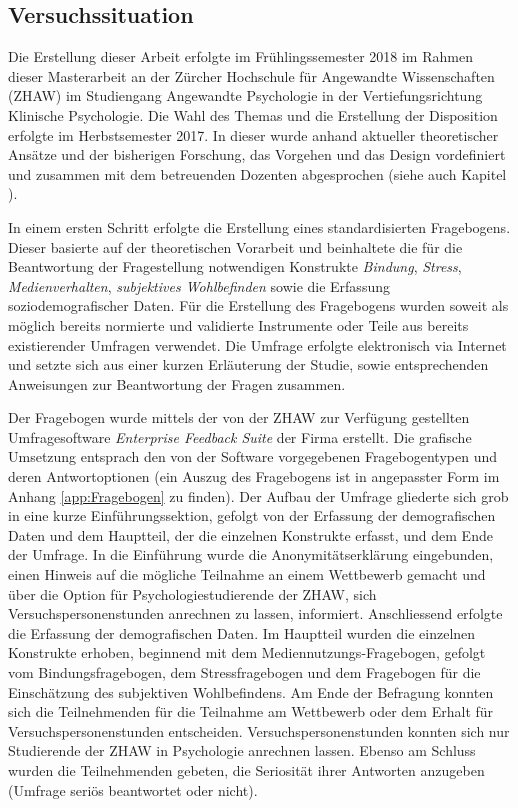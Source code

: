 \subsection{Versuchssituation}\label{sec:Versuchssituation}
Die Erstellung dieser Arbeit erfolgte im Frühlingssemester 2018 im Rahmen dieser Masterarbeit an der Zürcher Hochschule für Angewandte Wissenschaften (ZHAW) im Studiengang Angewandte Psychologie in der Vertiefungsrichtung Klinische Psychologie. Die Wahl des Themas und die Erstellung der Disposition erfolgte im Herbstsemester 2017. In dieser wurde anhand aktueller theoretischer Ansätze und der bisherigen Forschung, das Vorgehen und das Design vordefiniert und zusammen mit dem betreuenden Dozenten abgesprochen (siehe auch Kapitel \textit{}). 

In einem ersten Schritt erfolgte die Erstellung eines standardisierten Fragebogens. Dieser basierte auf der theoretischen Vorarbeit und beinhaltete die für die Beantwortung der Fragestellung notwendigen Konstrukte \textit{Bindung}, \textit{Stress}, \textit{Medienverhalten}, \textit{subjektives Wohlbefinden} sowie die Erfassung soziodemografischer Daten. Für die Erstellung des Fragebogens wurden soweit als möglich bereits normierte und validierte Instrumente oder Teile aus bereits existierender Umfragen verwendet. Die Umfrage erfolgte elektronisch via Internet und setzte sich aus einer kurzen Erläuterung der Studie, sowie entsprechenden Anweisungen zur Beantwortung der Fragen zusammen. 

Der Fragebogen wurde mittels der von der ZHAW zur Verfügung gestellten Umfragesoftware \textit{Enterprise Feedback Suite} der Firma  erstellt. Die grafische Umsetzung entsprach den von der Software vorgegebenen Fragebogentypen und deren Antwortoptionen (ein Auszug des Fragebogens ist in angepasster Form im Anhang \ref{app:Fragebogen} zu finden). Der Aufbau der Umfrage gliederte sich grob in eine kurze Einführungssektion, gefolgt von der Erfassung der demografischen Daten und dem Hauptteil, der die einzelnen Konstrukte erfasst, und dem Ende der Umfrage. In die Einführung wurde die Anonymitätserklärung eingebunden, einen Hinweis auf die mögliche Teilnahme an einem  Wettbewerb gemacht und über die Option für Psychologiestudierende der ZHAW, sich Versuchspersonenstunden anrechnen zu lassen, informiert. Anschliessend erfolgte die Erfassung der demografischen Daten. Im Hauptteil wurden die einzelnen Konstrukte erhoben, beginnend mit dem Mediennutzungs-Fragebogen, gefolgt vom Bindungsfragebogen, dem Stressfragebogen und dem Fragebogen für die Einschätzung des subjektiven Wohlbefindens. Am Ende der Befragung konnten sich die Teilnehmenden für die Teilnahme am Wettbewerb oder dem Erhalt für Versuchspersonenstunden entscheiden. Versuchspersonenstunden konnten sich nur Studierende der ZHAW in Psychologie anrechnen lassen. Ebenso am Schluss wurden die Teilnehmenden gebeten, die Seriosität ihrer Antworten anzugeben (Umfrage seriös beantwortet oder nicht). 

